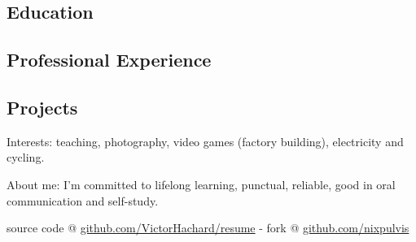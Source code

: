 





\vspace{-0.2em}


\subsection*{Education}


\subsection*{Professional Experience}


\subsection*{Projects}


\begin{indentsection}{\parindent}
\begin{description*}
  \item[Interests:]
    teaching, photography, video games (factory building), electricity and cycling.
  \item[About me:]
    I’m committed to lifelong learning, punctual, reliable,
    good in oral communication and self-study.
\end{description*}
\end{indentsection}

\begin{center}
\footnotesize \latex source code @
\href{http://www.github.com/VictorHachard/resume}
{github.com/VictorHachard/resume} - fork @
\href{http://www.github.com/nixpulvis}
{github.com/nixpulvis}
\end{center}

